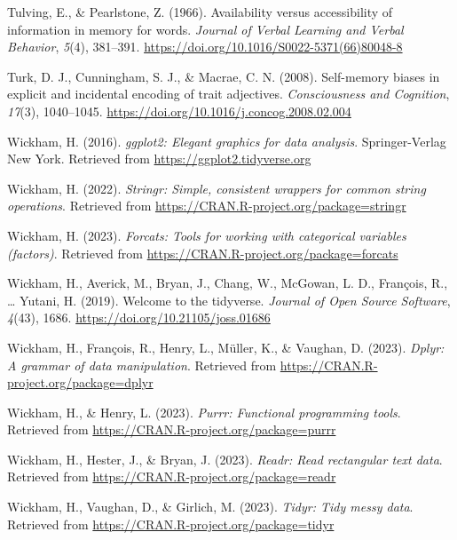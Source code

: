 \documentclass[
  man,floatsintext]{apa6}
\newlength{\cslhangindent}
\newlength{\cslentryspacingunit} %
\newenvironment{CSLReferences}[2] %
 {%
  \setlength{\parindent}{0pt}
  \ifodd #1
  \let\oldpar\par
  \def\par{\hangindent=\cslhangindent\oldpar}
  \fi
  \setlength{\parskip}{#2\cslentryspacingunit}
 }%
 {}
\begin{document}
\begin{CSLReferences}{1}{0}
\leavevmode{}%
Tulving, E., \& Pearlstone, Z. (1966). Availability versus accessibility of information in memory for words. \emph{Journal of Verbal Learning and Verbal Behavior}, \emph{5}(4), 381--391. \url{https://doi.org/10.1016/S0022-5371(66)80048-8}

\leavevmode{}%
Turk, D. J., Cunningham, S. J., \& Macrae, C. N. (2008). Self-memory biases in explicit and incidental encoding of trait adjectives. \emph{Consciousness and Cognition}, \emph{17}(3), 1040--1045. \url{https://doi.org/10.1016/j.concog.2008.02.004}

\leavevmode{}%
Wickham, H. (2016). \emph{ggplot2: Elegant graphics for data analysis}. Springer-Verlag New York. Retrieved from \url{https://ggplot2.tidyverse.org}

\leavevmode{}%
Wickham, H. (2022). \emph{Stringr: Simple, consistent wrappers for common string operations}. Retrieved from \url{https://CRAN.R-project.org/package=stringr}

\leavevmode{}%
Wickham, H. (2023). \emph{Forcats: Tools for working with categorical variables (factors)}. Retrieved from \url{https://CRAN.R-project.org/package=forcats}

\leavevmode{}%
Wickham, H., Averick, M., Bryan, J., Chang, W., McGowan, L. D., François, R., \ldots{} Yutani, H. (2019). Welcome to the {tidyverse}. \emph{Journal of Open Source Software}, \emph{4}(43), 1686. \url{https://doi.org/10.21105/joss.01686}

\leavevmode{}%
Wickham, H., François, R., Henry, L., Müller, K., \& Vaughan, D. (2023). \emph{Dplyr: A grammar of data manipulation}. Retrieved from \url{https://CRAN.R-project.org/package=dplyr}

\leavevmode{}%
Wickham, H., \& Henry, L. (2023). \emph{Purrr: Functional programming tools}. Retrieved from \url{https://CRAN.R-project.org/package=purrr}

\leavevmode{}%
Wickham, H., Hester, J., \& Bryan, J. (2023). \emph{Readr: Read rectangular text data}. Retrieved from \url{https://CRAN.R-project.org/package=readr}

\leavevmode{}%
Wickham, H., Vaughan, D., \& Girlich, M. (2023). \emph{Tidyr: Tidy messy data}. Retrieved from \url{https://CRAN.R-project.org/package=tidyr}

\end{CSLReferences}
\end{document}
